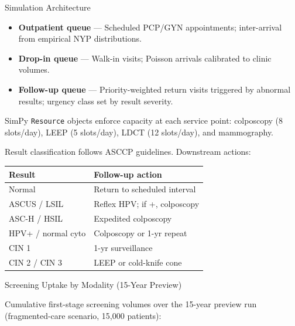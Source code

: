 \documentclass[final]{beamer}
\newlength{\colwidth}
\begin{document}
\begin{frame}[t]
\begin{columns}[t]
\begin{column}{\colwidth}
\begin{block}{Simulation Architecture}

    \begin{itemize}
      \item \textbf{Outpatient queue} — Scheduled PCP/GYN appointments;
            inter-arrival from empirical NYP distributions.
      \item \textbf{Drop-in queue} — Walk-in visits; Poisson arrivals
            calibrated to clinic volumes.
      \item \textbf{Follow-up queue} — Priority-weighted return visits
            triggered by abnormal results; urgency class set by result
            severity.
    \end{itemize}

    SimPy \texttt{Resource} objects enforce capacity at each service point:
    colposcopy (8 slots/day), LEEP (5 slots/day), LDCT (12 slots/day),
    and mammography.


    Result classification follows ASCCP guidelines. Downstream actions:

    \begin{center}
    \begin{tabular}{ll}
      \toprule
      \textbf{Result} & \textbf{Follow-up action} \\
      \midrule
      Normal            & Return to scheduled interval \\
      ASCUS / LSIL      & Reflex HPV; if +, colposcopy \\
      ASC-H / HSIL      & Expedited colposcopy \\
      HPV+ / normal cyto & Colposcopy or 1-yr repeat \\
      CIN 1             & 1-yr surveillance \\
      CIN 2 / CIN 3     & LEEP or cold-knife cone \\
      \bottomrule
    \end{tabular}
    \end{center}

  \end{block}

  \begin{block}{Screening Uptake by Modality (15-Year Preview)}

    Cumulative first-stage screening volumes over the 15-year preview run
    (fragmented-care scenario, 15{,}000 patients):

\vspace{1em}


\end{block}
\end{column}
\end{columns}
\end{frame}
\end{document}
